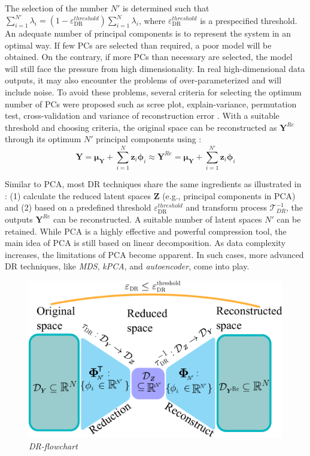 \documentclass{tufte-handout}
\begin{document}
 The selection of the number $N'$ is determined such that $\sum_{i=1}^{N'} \lambda_{i} = 
(1-\varepsilon_{\text{DR}}^{threshold})\sum_{i=1}^{N} \lambda_{i}$, where $\varepsilon_{\text{DR}}^{threshold}$ is a prespecified threshold. An adequate number of principal components is to represent the system in an optimal way. If few PCs are selected than required, a poor model will be obtained. On the contrary, if more PCs than necessary are selected, the model will still face the pressure from high dimensionality. In real high-dimensional data outputs, it may also encounter the problems of over-parameterized and will include noise. To avoid these problems, several criteria for selecting the optimum number of PCs were proposed such as scree plot, explain-variance, permutation test, cross-validation and variance of reconstruction error \cite{valle1999,saccenti2015,qin2000,mnassri2010}. With a suitable threshold and choosing criteria, the original space can be reconstructed as $\boldsymbol{Y}^{Re}$ through its optimum $N'$ principal components using :
\begin{equation}
\label{eq: PCA-reconstruct}
\boldsymbol{Y} 
=\boldsymbol{\mu_{Y}} + 
\sum_{i=1}^{N} \boldsymbol{z}_{i}\boldsymbol{\phi}_{i}
\approx \boldsymbol{Y}^{Re} 
= \boldsymbol{\mu_{Y}} + 
\sum_{i=1}^{N'} \boldsymbol{z}_{i}\boldsymbol{\phi}_{i}
\end{equation}



Similar to PCA, most DR techniques share the same ingredients as illustrated in : (1) calculate the reduced latent spaces $\boldsymbol{Z} $ (e.g., principal components in PCA) and (2) based on a predefined threshold $\varepsilon_{\text{DR}}^{threshold}$ and transform process $\mathcal{T}_{DR}^{-1}$, the outputs $\boldsymbol{Y}^{Re}$ can be reconstructed. A suitable number of latent spaces $N'$ can be retained. While PCA is a highly effective and powerful compression tool, the main idea of PCA is still based on linear decomposition. As data complexity increases, the limitations of PCA become apparent. In such cases, more advanced DR techniques, like \textit{MDS}, \textit{kPCA}, and \textit{autoencoder}, come into play.
\begin{figure}
  \includegraphics{figures/figure-PCA-flowchart.pdf}
  \caption{\textit{DR-flowchart}}
  \label{fig: PCA-flowchart}
\end{figure}




\end{document}
